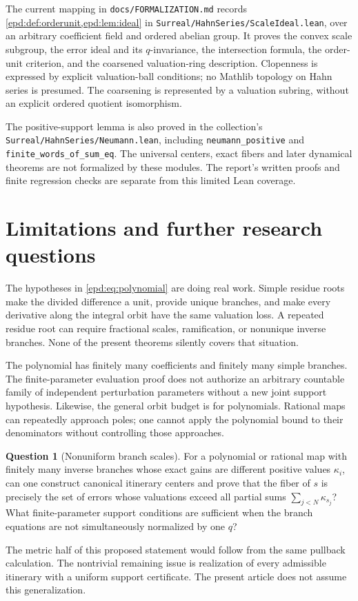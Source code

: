 \documentclass[11pt,a4paper]{article}
\numberwithin{equation}{section}
\theoremstyle{plain}
\theoremstyle{definition}
\newtheorem{question}[question]{Question}
\theoremstyle{remark}
\begin{document}
The current mapping in \texttt{docs/FORMALIZATION.md} records
\cref{epd:def:orderunit,epd:lem:ideal} in
\nolinkurl{Surreal/HahnSeries/ScaleIdeal.lean}, over an arbitrary coefficient
field and ordered abelian group. It proves the convex scale subgroup,
the error ideal and its $q$-invariance, the intersection formula,
the order-unit criterion, and the coarsened valuation-ring description.
Clopenness is expressed by explicit valuation-ball conditions; no
Mathlib topology on Hahn series is presumed. The coarsening is represented
by a valuation subring, without an explicit ordered quotient isomorphism.

The positive-support lemma is also proved in the collection's
\nolinkurl{Surreal/HahnSeries/Neumann.lean}, including
\texttt{neumann\_positive} and \texttt{finite\_words\_of\_sum\_eq}.
The universal centers, exact fibers and later dynamical theorems are
not formalized by these modules. The report's written proofs and finite
regression checks are separate from this limited Lean coverage.

\section{Limitations and further research questions}
\label{epd:sec:questions}
The hypotheses in \eqref{epd:eq:polynomial} are doing real work. Simple
residue roots make the divided difference a unit, provide unique
branches, and make every derivative along the integral orbit have the
same valuation loss. A repeated residue root can require fractional
scales, ramification, or nonunique inverse branches. None of the
present theorems silently covers that situation.

The polynomial has finitely many coefficients and finitely many simple
branches. The finite-parameter evaluation proof does not authorize an
arbitrary countable family of independent perturbation parameters
without a new joint support hypothesis. Likewise, the general orbit
budget is for polynomials. Rational maps can repeatedly approach poles;
one cannot apply the polynomial bound to their denominators without
controlling those approaches.

\begin{question}[Nonuniform branch scales]\label{epd:q:branch-scales}
For a polynomial or rational map with finitely many inverse branches
whose exact gains are different positive values $\kappa_i$, can one
construct canonical itinerary centers and prove that the fiber of
$s$ is precisely the set of errors whose valuations exceed all partial
sums $\sum_{j<N}\kappa_{s_j}$? What finite-parameter support conditions
are sufficient when the branch equations are not simultaneously
normalized by one $q$?
\end{question}
The metric half of this proposed statement would follow from the same
pullback calculation. The nontrivial remaining issue is realization
of every admissible itinerary with a uniform support certificate.
The present article does not assume this generalization.
\end{document}
